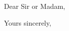 \documentclass{letter}
\begin{document}
	\begin{letter}{}
		\opening{Dear Sir or Madam,}

		\closing{Yours sincerely,}
	\end{letter}
\end{document}

